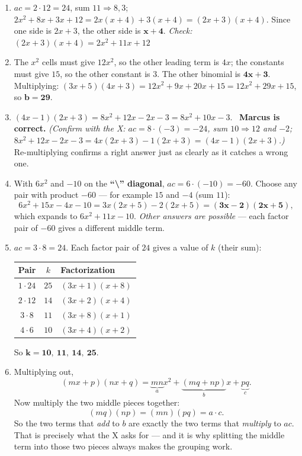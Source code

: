 \documentclass[11pt]{article}
\newcommand{\bsd}{\textbf{``\textbackslash'' diagonal}}
\begin{document}
\begin{anskey}[title={Practice F --- Reasoning \& Challenge}]
\begin{enumerate}[label=\textbf{\arabic*.},leftmargin=2em,itemsep=7pt]
\item $ac = 2\cdot 12 = 24$, sum $11 \Rightarrow 8,3$;
\ $2x^2+8x+3x+12 = 2x(x+4)+3(x+4) = (2x+3)(x+4)$.
Since one side is $2x+3$, the other side is $\mathbf{x+4}$.
\emph{Check:} $(2x+3)(x+4) = 2x^2+11x+12$ 

\item The $x^2$ cells must give $12x^2$, so the other leading term is $4x$; the constants must
give $15$, so the other constant is $3$. The other binomial is $\mathbf{4x+3}$.
Multiplying: $(3x+5)(4x+3) = 12x^2+9x+20x+15 = 12x^2+29x+15$, so $\mathbf{b = 29}$.

\item $(4x-1)(2x+3) = 8x^2 + 12x - 2x - 3 = 8x^2 + 10x - 3$.
\ \textbf{Marcus is correct.} 
\emph{(Confirm with the X: $ac = 8\cdot(-3) = -24$, sum $10 \Rightarrow 12$ and $-2$;
$8x^2+12x-2x-3 = 4x(2x+3)-1(2x+3) = (4x-1)(2x+3)$.)}
Re-multiplying confirms a right answer just as clearly as it catches a wrong one.

\item With $6x^2$ and $-10$ on the \bsd, $ac = 6\cdot(-10) = -60$. Choose any pair with
product $-60$ --- for example $15$ and $-4$ (sum $11$):
\[
6x^2 + 15x - 4x - 10 = 3x(2x+5) - 2(2x+5) = \mathbf{(3x-2)(2x+5)},
\]
which expands to $6x^2+11x-10$.
\emph{Other answers are possible} --- each factor pair of $-60$ gives a different middle term.

\item $ac = 3\cdot 8 = 24$. Each factor pair of $24$ gives a value of $k$ (their sum):
\begin{center}
\renewcommand{\arraystretch}{1.2}
\begin{tabular}{@{}c c l@{}}
\textbf{Pair} & $k$ & \textbf{Factorization} \\ \hline
$1\cdot 24$ & $25$ & $(3x+1)(x+8)$ \\
$2\cdot 12$ & $14$ & $(3x+2)(x+4)$ \\
$3\cdot 8$  & $11$ & $(3x+8)(x+1)$ \\
$4\cdot 6$  & $10$ & $(3x+4)(x+2)$ \\
\end{tabular}
\end{center}
So $\mathbf{k = 10,\ 11,\ 14,\ 25}$.

\item Multiplying out,
\[
(mx+p)(nx+q) = \underbrace{mn}_{a}x^2 + \underbrace{(mq+np)}_{b}x + \underbrace{pq}_{c}.
\]
Now multiply the two middle pieces together:
\[
(mq)(np) = (mn)(pq) = a \cdot c .
\]
So the two terms that \emph{add} to $b$ are exactly the two terms that \emph{multiply} to $ac$.
That is precisely what the X asks for --- and it is why splitting the middle term into those two
pieces always makes the grouping work.
\end{enumerate}
\end{anskey}
\end{document}
